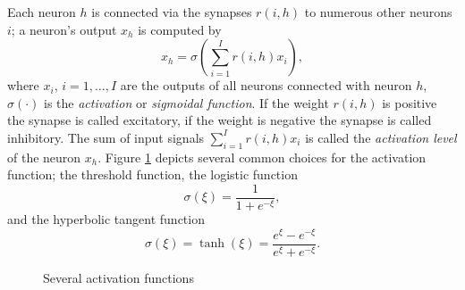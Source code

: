 Each neuron $h$ is connected via the synapses $r(i,h)$ to numerous other neurons $i$; a neuron's output $x_h$ is computed by
\begin{equation}
x_h = \sigma\left(\sum_{i=1}^I r(i,h) x_{i}\right),
\end{equation}
where $x_{i}$, $i = 1, \ldots, I$ are the outputs of all neurons connected with neuron $h$, $\sigma(\cdot)$ is the \emph{activation} or \emph{sigmoidal function}.   If the weight $r(i,h)$ is positive the synapse is called excitatory, if the weight is negative the synapse is called inhibitory.   The sum of input signals $\sum_{i=1}^I r(i,h) x_{i}$ is called the \emph{activation level} of the neuron $x_h$.  Figure \ref{fig:sigmoid} depicts several common choices for the activation function; the threshold function, the logistic function 
$$ \sigma(\xi) = \frac{1}{1 + e^{-\xi}},$$
and the hyperbolic tangent function
$$ \sigma(\xi) = \tanh(\xi) = \frac{e^\xi - e^{-\xi}}{e^\xi + e^{-\xi}}.$$
\begin{figure}[htbp]
\begin{center}
\caption{Several activation functions} 
\label{fig:sigmoid}
\small
\medskip

\end{center}
\end{figure}

